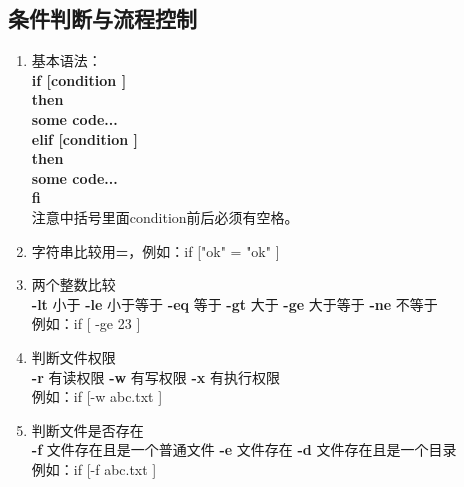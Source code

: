 \documentclass[11pt]{article}
\begin{document}
\subsection{条件判断与流程控制}
\begin{enumerate}
    \item 基本语法：\\
    \textbf{
        if [\quad condition \quad]  \\
        then \\
        some code... \\
        elif [\quad condition \quad]\\
        then \\
        some code... \\
        fi
    } \\
    注意中括号里面condition前后必须有空格。
    \item 字符串比较用\textbf{=}，例如：if [\quad "ok" = "ok" \quad]
    \item 两个整数比较 \\
    \textbf{-lt} 小于 \qquad \textbf{-le} 小于等于 \qquad \textbf{-eq} 等于 \qquad
    \textbf{-gt} 大于 \qquad \textbf{-ge} 大于等于 \qquad \textbf{-ne} 不等于 \\
    例如：if [ -ge 23 \quad]
    \item 判断文件权限 \\
    \textbf{-r} 有读权限 \qquad \textbf{-w} 有写权限 \qquad \textbf{-x} 有执行权限 \\
    例如：if [\quad -w abc.txt \quad]
    \item 判断文件是否存在 \\
    \textbf{-f} 文件存在且是一个普通文件 \qquad \textbf{-e} 文件存在 \qquad \textbf{-d}
    文件存在且是一个目录 \\
    例如：if [\quad -f abc.txt \quad]
\end{enumerate}

















    
\end{document}
